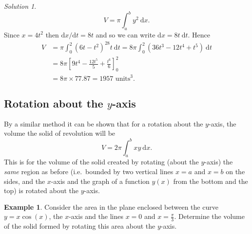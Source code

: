 \documentclass[
  english,
  11pt,
  oneside]{book}
\newcommand{\slide}{}
\theoremstyle{definition}
\theoremstyle{definition}
\newtheorem{example}{Example}[chapter]
\theoremstyle{definition}
\theoremstyle{definition}
\theoremstyle{remark}
\newtheorem*{solution}{Solution}
\begin{document}
\begin{solution}
\[V = \pi\int_a^b y^2\ \mathrm{d}x.\]
Since \(x=4t^2\) then \(\mathrm{d}x/\mathrm{d}t = 8t\) and so we can write \(\mathrm{d}x = 8t\ \mathrm{d}t\). Hence
\begin{align*}
V& = \pi\int_0^2(6t-t^2)^28t\ \mathrm{d}t = 8\pi\int_0^2(36t^3-12t^4+t^5)\ \mathrm{d}t\\
& = 8\pi\left[9t^4-\frac{12t^5}5+\frac{t^6}6\right]_0^2\\
&= 8\pi\times77.87 = 1957 \text{ units}^3.
\end{align*}
\end{solution}

\subsection{\texorpdfstring{Rotation about the \(y\)-axis}{Rotation about the y-axis}}\label{rotation-about-the-y-axis}

By a similar method it can be shown that for a rotation about the \(y\)-axis, the volume the solid of revolution will be
\[V = 2\pi\int_a^bxy\ \mathrm{d}x.\]
This is for the volume of the solid created by rotating (about the \(y\)-axis) the \emph{same} region as before (i.e.~bounded by two vertical lines \(x=a\) and \(x=b\) on the sides, and the \(x\)-axis and the graph of a function \(y(x)\) from the bottom and the top) is rotated about the \(y\)-axis.
\slide

\begin{example}
Consider the area in the plane enclosed between the curve \(y=x\cos(x)\), the \(x\)-axis and the lines \(x=0\) and \(x=\frac{\pi}{3}\). Determine the volume of the solid formed by rotating this area about the \(y\)-axis.
\end{example}
\end{document}
